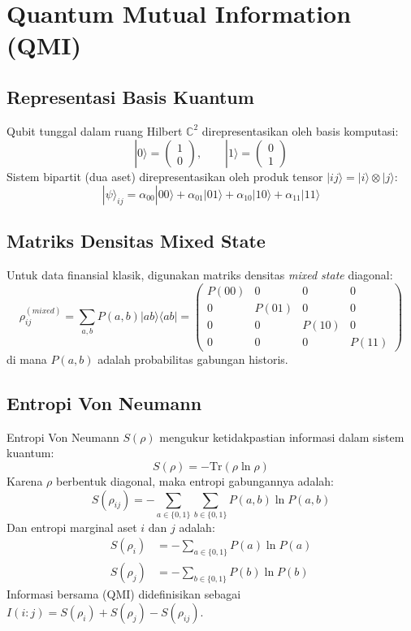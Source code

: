 \section{Quantum Mutual Information (QMI)}

\subsection{Representasi Basis Kuantum}
Qubit tunggal dalam ruang Hilbert $\mathbb{C}^2$ direpresentasikan oleh basis komputasi:
\begin{equation}
|0\rangle = \begin{pmatrix} 1 \\ 0 \end{pmatrix}, \qquad |1\rangle = \begin{pmatrix} 0 \\ 1 \end{pmatrix}
\end{equation}
Sistem bipartit (dua aset) direpresentasikan oleh produk tensor $|ij\rangle = |i\rangle \otimes |j\rangle$:
\begin{equation}
|\psi\rangle_{ij} = \alpha_{00}|00\rangle + \alpha_{01}|01\rangle + \alpha_{10}|10\rangle + \alpha_{11}|11\rangle
\end{equation}

\subsection{Matriks Densitas Mixed State}
Untuk data finansial klasik, digunakan matriks densitas \textit{mixed state} diagonal:
\begin{equation}
\rho_{ij}^{(mixed)} = \sum_{a,b} P(a,b) |ab\rangle\langle ab| = \begin{pmatrix} P(00) & 0 & 0 & 0 \\ 0 & P(01) & 0 & 0 \\ 0 & 0 & P(10) & 0 \\ 0 & 0 & 0 & P(11) \end{pmatrix}
\end{equation}
di mana $P(a,b)$ adalah probabilitas gabungan historis.

\subsection{Entropi Von Neumann}
Entropi Von Neumann $S(\rho)$ mengukur ketidakpastian informasi dalam sistem kuantum:
\begin{equation}
S(\rho) = -\text{Tr}(\rho \ln \rho)
\end{equation}
Karena $\rho$ berbentuk diagonal, maka entropi gabungannya adalah:
\begin{equation}
S(\rho_{ij}) = -\sum_{a \in \{0, 1\}} \sum_{b \in \{0, 1\}} P(a, b) \ln P(a, b)
\end{equation}
Dan entropi marginal aset $i$ dan $j$ adalah:
\begin{align}
S(\rho_i) &= -\sum_{a \in \{0, 1\}} P(a) \ln P(a) \\
S(\rho_j) &= -\sum_{b \in \{0, 1\}} P(b) \ln P(b)
\end{align}
Informasi bersama (QMI) didefinisikan sebagai $I(i:j) = S(\rho_i) + S(\rho_j) - S(\rho_{ij})$.
